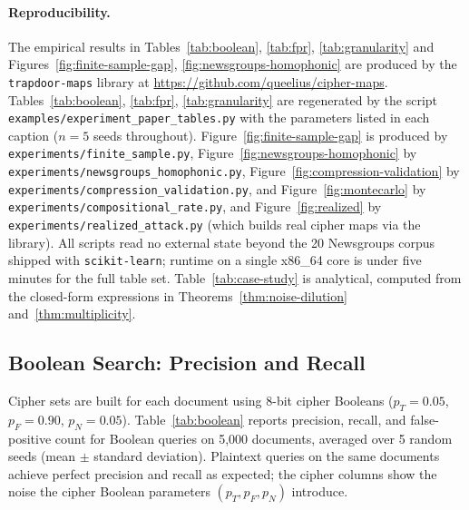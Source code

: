 \documentclass[11pt]{article}
\theoremstyle{definition}
\theoremstyle{plain}
\theoremstyle{remark}
\begin{document}
\paragraph{Reproducibility.}
{\sloppy
The empirical results in Tables~\ref{tab:boolean}, \ref{tab:fpr},
\ref{tab:granularity} and Figures~\ref{fig:finite-sample-gap},
\ref{fig:newsgroups-homophonic} are produced by the
\texttt{trapdoor-maps} library at
\url{https://github.com/queelius/cipher-maps}.  Tables~\ref{tab:boolean},
\ref{tab:fpr}, \ref{tab:granularity} are regenerated by the script
\texttt{examples/experiment\_paper\_tables.py} with the parameters
listed in each caption ($n=5$ seeds throughout).
Figure~\ref{fig:finite-sample-gap} is produced by
\texttt{experiments/finite\_sample.py},
Figure~\ref{fig:newsgroups-homophonic} by
\texttt{experiments/newsgroups\_homophonic.py},
Figure~\ref{fig:compression-validation} by
\texttt{experiments/compression\_validation.py}, and
Figure~\ref{fig:montecarlo} by
\texttt{experiments/compositional\_rate.py}, and
Figure~\ref{fig:realized} by
\texttt{experiments/realized\_attack.py} (which builds real cipher
maps via the library).  All scripts read no external state beyond the
20 Newsgroups corpus shipped with \texttt{scikit-learn}; runtime on a
single x86\_64 core is under five minutes for the full table set.  Table~\ref{tab:case-study} is
analytical, computed from the closed-form expressions in
Theorems~\ref{thm:noise-dilution} and~\ref{thm:multiplicity}.
\par}

\subsection{Boolean Search: Precision and Recall}

Cipher sets are built for each document using 8-bit cipher Booleans
($p_T = 0.05$, $p_F = 0.90$, $p_N = 0.05$).  Table~\ref{tab:boolean}
reports precision, recall, and false-positive count for Boolean
queries on 5,000 documents, averaged over 5 random seeds (mean
$\pm$ standard deviation).  Plaintext queries on the same documents
achieve perfect precision and recall as expected; the cipher
columns show the noise the cipher Boolean parameters
$(p_T, p_F, p_N)$ introduce.
\end{document}
